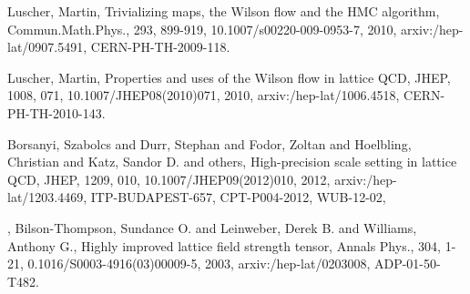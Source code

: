 \documentclass[12pt]{article}
\begin{document}
\begin{thebibliography}{9}
      
      Luscher, Martin,
      Trivializing maps, the Wilson flow and the HMC
                        algorithm,
      Commun.Math.Phys.,
      293,
      899-919,
      10.1007/s00220-009-0953-7,
      2010,
      arxiv:/hep-lat/0907.5491,
      CERN-PH-TH-2009-118.
      
      Luscher, Martin,
      Properties and uses of the Wilson flow in lattice QCD,
      JHEP,
      1008,
      071,
      10.1007/JHEP08(2010)071,
      2010,
      arxiv:/hep-lat/1006.4518,
      CERN-PH-TH-2010-143.
      
      Borsanyi, Szabolcs and Durr, Stephan and Fodor, Zoltan and Hoelbling, Christian and Katz, Sandor D. and others,
      High-precision scale setting in lattice QCD,
      JHEP,
      1209,
      010,
      10.1007/JHEP09(2012)010,
      2012,
      arxiv:/hep-lat/1203.4469,
      ITP-BUDAPEST-657, CPT-P004-2012, WUB-12-02,
      
,
      Bilson-Thompson, Sundance O. and Leinweber, Derek B. and
                        Williams, Anthony G.,
      Highly improved lattice field strength tensor,
      Annals Phys.,
      304,
      1-21,
      0.1016/S0003-4916(03)00009-5,
      2003,
      arxiv:/hep-lat/0203008,
      ADP-01-50-T482.
     
\end{thebibliography}
\end{document}
